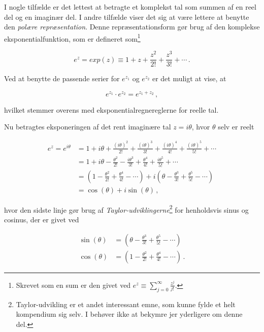 \documentclass[a4paper, 12pt,titlepage]{article}
\begin{document}
I nogle tilfælde er det lettest at betragte et komplekst tal som summen af en reel del og en imaginær del. I andre tilfælde viser det sig at være lettere at benytte den \emph{polære repræsentation}. Denne repræsentationsform gør brug af den komplekse eksponentialfunktion, som er defineret som\footnote{Skrevet som en sum er den givet ved \(e^z \equiv \sum_{j=0}^{\infty} \frac{z^j}{j!}\).}

\begin{equation}
\label{expz}
    e^z = exp(z) \equiv 1 + z + \frac{z^2}{2!} + \frac{z^3}{3!} + \cdots \, . 
\end{equation}

Ved at benytte de passende serier for \(e^{z_1}\) og \(e^{z_2}\) er det muligt at vise, at

\begin{equation}
\label{ee}
    e^{z_1} \cdot e^{z_2} = e^{z_1+z_2} \,,
\end{equation}

hvilket stemmer overens med eksponentialregnereglerne for reelle tal.

Nu betragtes eksponeringen af det rent imaginære tal \(z=i\theta\), hvor \(\theta\) selv er reelt

\begin{equation}
\label{taylor}
\begin{aligned}
    e^z = e^{i\theta}&= 1+ i\theta + \frac{(i \theta)^2}{2!} + \frac{(i\theta)^3}{3!} + \frac{(i\theta)^4}{4!}+ \frac{(i\theta)^5}{5!}+\cdots  \\
                     &= 1 + i\theta - \frac{\theta^2}{2!} - \frac{i\theta^3}{3!} + \frac{\theta^4}{4!} + \frac{i\theta^5}{5!} +\cdots \\
                     &=\left(1- \frac{\theta^2}{2!} + \frac{\theta^4}{4!} - \cdots\right) + i \left(\theta - \frac{\theta^3}{3!} + \frac{\theta^5}{5!}-\cdots \right) \\
                     &= \cos \left(\theta\right) + i \sin\left(\theta\right)\,,
\end{aligned} 
\end{equation}

hvor den sidste linje gør brug af \emph{Taylor-udviklingerne}​\footnote{Taylor-udvikling er et andet interessant emne, som kunne fylde et helt kompendium sig selv. I behøver ikke at bekymre jer yderligere om denne del.} for henholdsvis sinus og cosinus, der er givet ved

\begin{align*}
    \sin \left(\theta \right) &= \left(\theta - \frac{\theta^3}{3!} + \frac{\theta^5}{5!}-\cdots \right) \\
    \cos \left(\theta \right) &=\left(1- \frac{\theta^2}{2!} + \frac{\theta^4}{4!} - \cdots\right) \,.
\end{align*}
\end{document}
